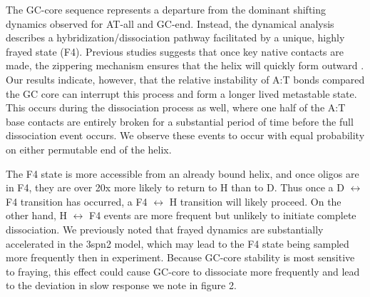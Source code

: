 \documentclass[journal=jpcbfk,manuscript=article]{achemso}
\begin{document}
The GC-core sequence represents a departure from the dominant shifting dynamics observed for AT-all and GC-end. Instead, the dynamical analysis describes a hybridization/dissociation pathway facilitated by a unique, highly frayed state (F4). Previous studies suggests that once key native contacts are made, the zippering mechanism ensures that the helix will quickly form outward \citep{Romano2013DNADependence, Yin2011KineticsHybridization}. Our results indicate, however, that the relative instability of A:T bonds compared the GC core can interrupt this process and form a longer lived metastable state. This occurs during the dissociation process as well, where one half of the A:T base contacts are entirely broken for a substantial period of time before the full dissociation event occurs. We observe these events to occur with equal probability on either permutable end of the helix. 

The F4 state is more accessible from an already bound helix, and once oligos are in F4, they are over 20x more likely to return to H than to D. Thus once a D $\leftrightarrow$ F4 transition has occurred, a F4 $\leftrightarrow$ H transition will likely proceed. On the other hand, H $\leftrightarrow$ F4 events are more frequent but unlikely to initiate complete dissociation. We previously noted that frayed dynamics are substantially accelerated in the 3spn2 model, which may lead to the F4 state being sampled more frequently then in experiment. Because GC-core stability is most sensitive to fraying, this effect could cause GC-core to dissociate more frequently and lead to the deviation in slow response we note in figure 2.
\end{document}
